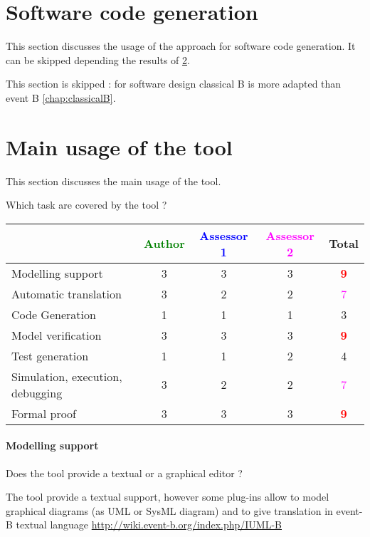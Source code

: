 \section{Software code generation}
This section discusses the usage of the approach for software code generation.
It can be skipped depending the results of \ref{main_usage}.


\begin{author_comment}
This section is skipped :  for software design classical B is more adapted than event B \ref{chap:classicalB}.
\end{author_comment}




\section{Main usage of the tool}
\label{main_usage}

This section discusses the main usage of the tool.

Which task are covered by the tool ?


\begin{tabular}{|l | c | c | c | c|}
\hline
& \textcolor{green}{Author} & \textcolor{blue}{Assessor 1} & \textcolor{magenta}{Assessor 2} & Total \\
\hline 
Modelling support & 3    & 3    & 3    & \textcolor{red}{\textbf{9}} \\
\hline
Automatic translation  & 3    & 2    & 2    & \textcolor{magenta}{7} \\
\hline
Code Generation  & 1    & 1    & 1    & 3    \\
\hline
Model verification & 3    & 3    & 3    & \textcolor{red}{\textbf{9}} \\
\hline
Test generation & 1    & 1    & 2    & 4    \\
\hline
Simulation, execution, debugging & 3    & 2    & 2    & \textcolor{magenta}{7} \\
\hline
Formal proof & 3    & 3    & 3    & \textcolor{red}{\textbf{9}} \\
\hline
\end{tabular}

\paragraph{Modelling support}
Does the tool provide a  textual or a graphical editor ?


\begin{author_comment}
The tool provide a textual support, however some plug-ins allow to  model graphical diagrams (as UML or SysML diagram) and to give translation in event-B textual language \url{http://wiki.event-b.org/index.php/IUML-B}
\end{author_comment}



